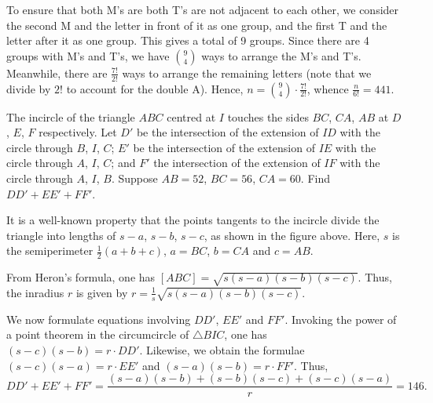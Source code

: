 To ensure that both M's are both T's are not adjacent to each other, we consider the second M and the letter in front of it as one group, and the first T and the letter after it as one group. This gives a total of 9 groups. Since there are 4 groups with M's and T's, we have $\binom{9}{4}$ ways to arrange the M's and T's. Meanwhile, there are $\frac{7!}{2!}$ ways to arrange the remaining letters (note that we divide by $2!$ to account for the double A). Hence, $n = \binom{9}{4} \cdot \frac{7!}{2!}$, whence $\frac{n}{6!} = 441$.

\begin{question}[146]\label{A::2024-O-1-25}
    The incircle of the triangle $ABC$ centred at $I$ touches the sides $BC$, $CA$, $AB$ at $D$, $E$, $F$ respectively. Let $D'$ be the intersection of the extension of $ID$ with the circle through $B$, $I$, $C$; $E'$ be the intersection of the extension of $IE$ with the circle through $A$, $I$, $C$; and $F'$ the intersection of the extension of $IF$ with the circle through $A$, $I$, $B$. Suppose $AB = 52$, $BC = 56$, $CA = 60$. Find $DD' + EE' + FF'$.
\end{question}

\begin{center}
\end{center}

It is a well-known property that the points tangents to the incircle divide the triangle into lengths of $s-a$, $s-b$, $s-c$, as shown in the figure above. Here, $s$ is the semiperimeter $\frac12(a+b+c)$, $a = BC$, $b = CA$ and $c = AB$.

From Heron's formula, one has $[ABC] = \sqrt{s(s-a)(s-b)(s-c)}$. Thus, the inradius $r$ is given by $r = \frac1s \sqrt{s(s-a)(s-b)(s-c)}$.

We now formulate equations involving $DD'$, $EE'$ and $FF'$. Invoking the power of a point theorem in the circumcircle of $\triangle BIC$, one has $(s-c)(s-b) = r \cdot DD'$. Likewise, we obtain the formulae $(s-c)(s-a) = r \cdot EE'$ and $(s-a)(s-b) = r \cdot FF'$. Thus, \[DD' + EE' + FF' = \frac{(s-a)(s-b) + (s-b)(s-c) + (s-c)(s-a)}r = 146.\]